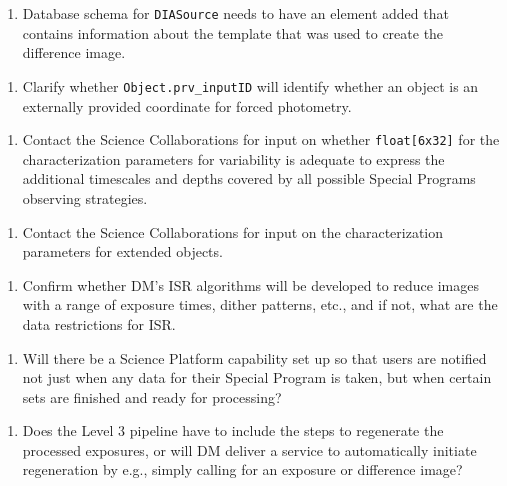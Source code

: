 \documentclass[DM,lsstdraft,toc]{lsstdoc}
\begin{document}
\begin{enumerate}[resume,topsep=-10pt,label= \textbf{Concern \Roman*.}] \item \label{C8} Database schema for {\tt DIASource} needs to have an element added that contains information about the template that was used to create the difference image. \end{enumerate}
\begin{enumerate}[resume,topsep=-10pt,label= \textbf{Concern \Roman*.}] \item \label{C9} Clarify whether {\tt Object.prv\_inputID} will identify whether an object is an externally provided coordinate for forced photometry. \end{enumerate}
\begin{enumerate}[resume,topsep=-10pt,label= \textbf{Concern \Roman*.}] \item \label{C10} Contact the Science Collaborations for input on whether {\tt float[6x32]} for the characterization parameters for variability is adequate to express the additional timescales and depths covered by all possible Special Programs observing strategies. \end{enumerate}
\begin{enumerate}[resume,topsep=-10pt,label= \textbf{Concern \Roman*.}] \item \label{C11} Contact the Science Collaborations for input on the characterization parameters for extended objects. \end{enumerate}
\begin{enumerate}[resume,topsep=-10pt,label= \textbf{Concern \Roman*.}] \item \label{C12} Confirm whether DM's ISR algorithms will be developed to reduce images with a range of exposure times, dither patterns, etc., and if not, what are the data restrictions for ISR. \end{enumerate}
\begin{enumerate}[resume,topsep=-10pt,label= \textbf{Concern \Roman*.}] \item \label{C13} Will there be a Science Platform capability set up so that users are notified not just when any data for their Special Program is taken, but when certain sets are finished and ready for processing? \end{enumerate}
\begin{enumerate}[resume,topsep=-10pt,label= \textbf{Concern \Roman*.}] \item \label{C14} Does the Level 3 pipeline have to include the steps to regenerate the processed exposures, or will DM deliver a service to automatically initiate regeneration by e.g., simply calling for an exposure or difference image? \end{enumerate}
\end{document}
